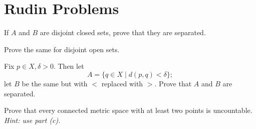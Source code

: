 \documentclass{assignment}
\begin{document}
\maketitle

\section*{Rudin Problems}
\begin{question}[2.19*]
  \begin{qparts}
   \item If $A$ and $B$ are disjoint closed sets, prove that they are separated.
   \item Prove the same for disjoint open sets.
   \item Fix $p\in X, \delta > 0.$ Then let $$A = \{q\in X \mid d(p,q) < \delta\};$$ let $B$ be the 
   same but with $<$ replaced with $>$. Prove that $A$ and $B$ are separated.
   \item Prove that every connected metric space with at least two points is uncountable. \emph{Hint:
   use part (c).}
  \end{qparts} 
\end{question}
\end{document}

